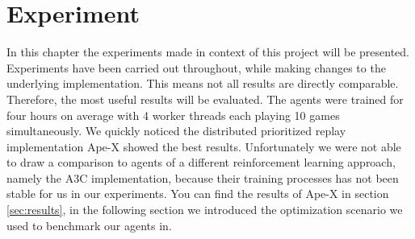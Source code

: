\documentclass[12pt,a4paper]{article}
\begin{document}
\section{Experiment}
In this chapter the experiments made in context of this project will be presented. Experiments have been carried out throughout, while making changes to the underlying implementation. This means not all results are directly comparable. Therefore, the most useful results will be evaluated.
The agents were trained for four hours on average with 4 worker threads each playing 10 games simultaneously.
We quickly noticed the distributed prioritized replay implementation Ape-X showed the best results. Unfortunately we were not able to draw a comparison to agents of a different reinforcement learning approach, namely the A3C implementation, because their training processes has not been stable for us in our experiments. You can find the results of Ape-X in section \ref{sec:results}, in the following section we introduced the optimization scenario we used to benchmark our agents in.
\end{document}
